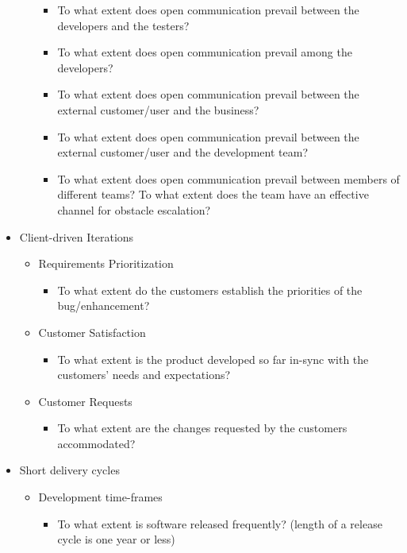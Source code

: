 \begin{appendices}
\begin{itemize}
\begin{itemize}
\begin{itemize}
					\item To what extent does open communication prevail between the developers and the testers? 
					\item To what extent does open communication prevail among the developers? 
					\item To what extent does open communication prevail between the external customer/user and the business? 
					\item To what extent does open communication prevail between the external customer/user and the development team? 
					\item To what extent does open communication prevail between members of different teams?
					\addition To what extent does the team have an effective channel for obstacle escalation?
				\end{itemize}
		\end{itemize}
	\item Client-driven Iterations
		\begin{itemize}
			\item Requirements Prioritization
				\begin{itemize}
					\item To what extent do the customers establish the priorities of the bug/enhancement?
				\end{itemize}
			\item Customer Satisfaction
				\begin{itemize}
					\item To what extent is the product developed so far in-sync with the customers' needs and expectations?
				\end{itemize}
			\item Customer Requests
				\begin{itemize}
					\item To what extent are the changes requested by the customers accommodated?
				\end{itemize}			
		\end{itemize}
	\item Short delivery cycles
		\begin{itemize}
			\item Development time-frames
				\begin{itemize}
					\item To what extent is software released frequently? (length of a release cycle is one year or less)

\end{itemize}
\end{itemize}
\end{itemize}
\end{appendices}
